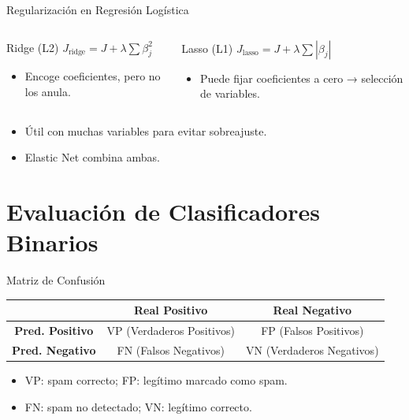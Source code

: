 \documentclass[aspectratio=169, 10pt, xcolor=table]{beamer}
\begin{document}
\begin{frame}{Regularización en Regresión Logística}
    \begin{columns}[t]
        \begin{block}{Ridge (L2)}
            $J_{\text{ridge}} = J + \lambda \sum \beta_j^2$
            \begin{itemize}
                \item Encoge coeficientes, pero no los anula.
            \end{itemize}
        \end{block}
        \begin{block}{Lasso (L1)}
            $J_{\text{lasso}} = J + \lambda \sum |\beta_j|$
            \begin{itemize}
                \item Puede fijar coeficientes a cero → selección de variables.
            \end{itemize}
        \end{block}
    \end{columns}
    \vspace{0.3cm}
    \begin{itemize}
        \item Útil con muchas variables para evitar sobreajuste.
        \item Elastic Net combina ambas.
    \end{itemize}
\end{frame}

\section{Evaluación de Clasificadores Binarios}

\begin{frame}{Matriz de Confusión}
    \begin{table}
        \centering
        \begin{tabular}{c|c|c}
            & \textbf{Real Positivo} & \textbf{Real Negativo} \\
            \hline
            \textbf{Pred. Positivo} & VP (Verdaderos Positivos) & FP (Falsos Positivos) \\
            \textbf{Pred. Negativo} & FN (Falsos Negativos) & VN (Verdaderos Negativos) \\
        \end{tabular}
    \end{table}
    \begin{itemize}
        \item VP: spam correcto; FP: legítimo marcado como spam.
        \item FN: spam no detectado; VN: legítimo correcto.
    \end{itemize}
\end{frame}
\end{document}
